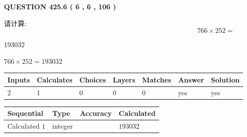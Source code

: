 \documentclass{ctexart}
\begin{document}
   
  
\vspace{0.2in}
  
{\textbf{\Large{QUESTION
425.6 
 ( 6 , 6 , 106 )
}}}
  
  
 
请计算:
\begin{equation}
766  \times    %
252 = \nonumber
\end{equation}
 
 
 
\noindent{}
 
 

193032
 
 
\noindent{}
 
 

 
 
 
\noindent{}
 
 

$ %
766 \times  %
252=   %
193032$
 
 
\noindent{}
 
 

 
   
   
   
   
\noindent\begin{tabular}{|l|l|l|l|l|l|l|}
 \hline
Inputs & Calculates & Choices & Layers & Matches & Answer & Solution \\ \hline
 2  & 
 1  & 
 0
  & 
 0  & 
 0  & 
  yes & 
  yes 
  \\ \hline
 \end{tabular}
   
   
   
   
\noindent{}
   
   
  
  
\noindent\begin{tabular}{|l|l|l|l|}
\hline
 Sequential & Type & Accuracy & Calculated \\ 
\hline
 
 
  Calculated $  1 $ & integer &  & 
  $ 193032 $ 
 \\  \hline  
 \end{tabular}
   
\end{document}
